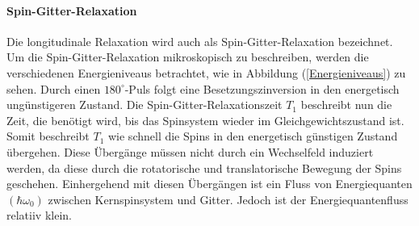 \paragraph{Spin-Gitter-Relaxation}
Die longitudinale Relaxation wird auch als Spin-Gitter-Relaxa{\-}tion bezeichnet.
Um die Spin-Gitter-Relaxation mikroskopisch zu beschreiben, werden die verschiedenen Energieniveaus betrachtet, wie in Abbildung (\ref{Energieniveaus}) zu sehen.
Durch einen $180^{\circ}$-Puls folgt eine Besetzungszinversion in den energetisch ung\"{u}nstigeren Zustand.
Die Spin-Gitter-Relaxationszeit $T_1$ beschreibt nun die Zeit, die ben\"{o}tigt wird, bis das Spinsystem wieder im Gleichgewichtszustand ist.
Somit beschreibt $T_1$ wie schnell  die Spins in den energetisch g\"{u}nstigen Zustand \"{u}bergehen.
Diese \"{U}berg\"{a}nge m\"{u}ssen nicht durch ein Wechselfeld induziert werden, da diese durch die rotatorische und translatorische Bewegung der Spins geschehen.
Einhergehend mit diesen \"{U}berg\"{a}ngen ist ein Fluss von Energiequanten $(\hbar \omega_0)$ zwischen Kernspinsystem und Gitter.
Jedoch ist der Energiequantenfluss relatiiv klein.

